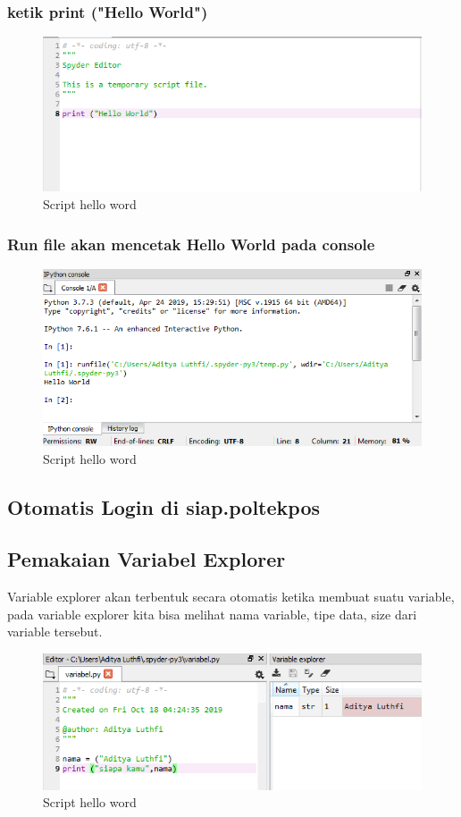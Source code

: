 \documentclass[12pt, times new roman, a4paper]{article}
\begin{document}
\subsubsection{ketik print ("Hello World")}
	\begin{figure}[h]
		\centering
		\includegraphics[scale=0.7]{Gambar/h1}
		\caption{Script hello word}
	\end{figure}
\subsubsection{Run file akan mencetak Hello World pada console}
	\begin{figure}[h]
		\centering
		\includegraphics[scale=0.7]{Gambar/h2}
		\caption{Script hello word}
	\end{figure}
	
\subsection{Otomatis Login di siap.poltekpos}

\subsection{Pemakaian Variabel Explorer}
Variable explorer akan terbentuk secara otomatis ketika membuat suatu variable, pada variable explorer kita bisa melihat nama variable, tipe data, size dari variable tersebut.
	\begin{figure}[h]
		\centering
		\includegraphics[scale=0.5]{Gambar/v}
		\caption{Script hello word}
	\end{figure}
	
\end{document}
